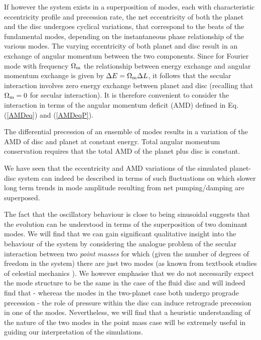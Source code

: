 \documentclass[usenatbib,a4paper,times,fleqn]{mnras}
\begin{document}
If however the system exists in a superposition of modes, each with characteristic eccentricity profile and precession rate, the net eccentricity of both the planet and the disc undergoes cyclical variations, that correspond to the beats of the fundamental modes, depending on the instantaneous phase relationship of the various modes.
The varying eccentricity of both planet and disc result in an exchange of angular momentum between the two components. Since for Fourier mode with frequency $\Omega_{\rm m}$ the relationship between energy exchange and angular momentum exchange is given by $\Delta E = \Omega_{\rm m} \Delta L$, it follows that the secular interaction involves zero energy exchange between planet and disc (recalling that $\Omega_{\rm m}=0$ for secular interaction). It is therefore convenient to consider the interaction in terms of the angular momentum deficit (AMD) defined in Eq. (\ref{AMDeq}) and (\ref{AMDeqP}).

The differential precession of an ensemble of modes results in a variation of the AMD of disc and planet at constant energy. Total angular momentum conservation requires that the total AMD of the planet plus disc is constant.

We have seen that the eccentricity and AMD variations of the simulated planet-disc system can indeed be described in terms
of such fluctuations on which slower long term trends in mode amplitude resulting from net pumping/damping are superposed. 

The fact that the oscillatory behaviour is close to being sinusoidal suggests  that the evolution can be understood in terms of the superposition of two dominant modes. We will find that we can gain significant qualitative insight into the behaviour of the system by considering the analogue problem of the secular interaction between two {\it point masses} for which (given the number of degrees of freedom in the system) there are just two modes (as known from textbook studies of celestial mechanics \citealp{murray1999}). We however emphasise that we do not necessarily expect the mode structure to be the same in the case of the fluid disc and will indeed find that - whereas the modes in the two-planet case both undergo prograde precession - the role of pressure within the disc can induce retrograde precession in one of the modes. Nevertheless, we will find that a heuristic understanding of the nature of the two modes in the point mass case will be extremely useful in guiding our interpretation of the simulations.
\end{document}
